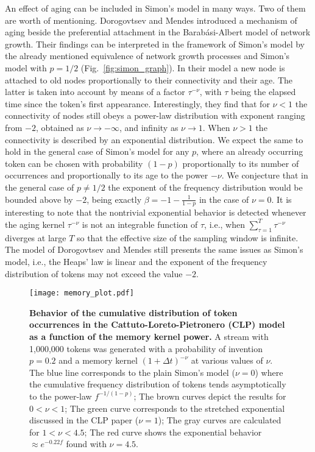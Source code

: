 \documentclass[graybox]{svmult}
\begin{document}
An effect of aging can be included in Simon's model in many ways. Two of them are worth of mentioning.
Dorogovtsev and Mendes \cite{mendes2000} introduced a mechanism of aging beside the preferential attachment in the Barab\'asi-Albert model of network growth. Their findings can be interpreted in the framework of Simon's model by the already mentioned equivalence of network growth processes and Simon's model with $p=1/2$ (Fig.~\ref{fig:simon_graph}). 
In their model a new node is attached to old nodes proportionally to their connectivity and their age. 
The latter is taken into account by means of a factor $\tau^{-\nu}$, with $\tau$ being the elapsed time since the token's first appearance. 
Interestingly, they find that for $\nu <1$ the connectivity of nodes still obeys a power-law distribution with exponent ranging from $-2$, obtained as $\nu \rightarrow -\infty$, and infinity as $\nu \rightarrow 1$. When $\nu >1$ the connectivity is described by an exponential distribution.
We expect the same to hold in the general case of Simon's model for any $p$, where an already occurring token can be chosen with probability $(1-p)$ proportionally to its number of occurrences and proportionally to its age to the power $-\nu$. 
We conjecture that in the general case of $p\neq 1/2$ the exponent of the frequency distribution would be bounded  above by $-2$, being exactly $\beta= -1-\frac{1}{1-p}$ in the case of $\nu=0$.
It is interesting to note that the nontrivial exponential behavior is detected whenever the aging kernel $\tau^{-\nu}$ is not an integrable function of $\tau$, i.e., when $\sum_{\tau=1}^T \tau^{-\nu}$ diverges at large $T$ so that the effective size of the sampling window is infinite.
The model of Dorogovtsev and Mendes still presents the same issues as Simon's model, i.e., the Heaps' law is linear and the exponent of the frequency distribution of tokens may not exceed the value $-2$.

\begin{figure*}[t]
\centering
\texttt{[image: memory\_plot.pdf]} 
\caption{ 
  \textbf{Behavior of the cumulative distribution of token occurrences in the Cattuto-Loreto-Pietronero (CLP) model \cite{cattuto_pnas} as a function of the memory kernel power.}
  A stream with 1,000,000 tokens was generated with a probability of invention $p=0.2$ and a memory kernel $(1+\Delta t)^{-\nu}$ at various values of $\nu$.
  The blue line corresponds to the plain Simon's model ($\nu=0$) where the cumulative frequency distribution of tokens tends asymptotically to the power-law $f^{-1/(1-p)}$;
  The brown curves depict the results for $0<\nu<1$;
  The green curve corresponds to the stretched exponential discussed in the CLP paper ($\nu=1$);
  The gray curves are calculated for $1<\nu<4.5$;
  The red curve shows the exponential behavior $\approx e^{-0.22 f}$ found with $\nu=4.5$.
\label{fig:memory}}
\end{figure*}
\end{document}
